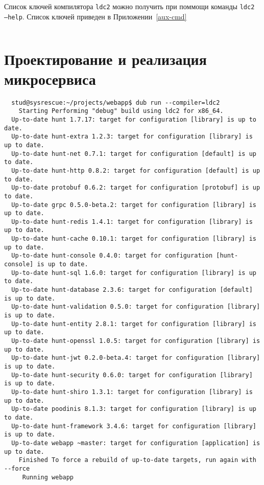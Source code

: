 \documentclass{studrep}
\begin{document}
Список ключей компилятора \texttt{ldc2} можно получить при поммощи команды \texttt{ldc2 --help}. Список ключей приведен в Приложении~\ref{aux-cmd}

\begin{verbatim}

\end{verbatim}

\chapter{Проектирование и реализация микросервиса}



\begin{verbatim}
  stud@sysrescue:~/projects/webapp$ dub run --compiler=ldc2
    Starting Performing "debug" build using ldc2 for x86_64.
  Up-to-date hunt 1.7.17: target for configuration [library] is up to date.
  Up-to-date hunt-extra 1.2.3: target for configuration [library] is up to date.
  Up-to-date hunt-net 0.7.1: target for configuration [default] is up to date.
  Up-to-date hunt-http 0.8.2: target for configuration [default] is up to date.
  Up-to-date protobuf 0.6.2: target for configuration [protobuf] is up to date.
  Up-to-date grpc 0.5.0-beta.2: target for configuration [library] is up to date.
  Up-to-date hunt-redis 1.4.1: target for configuration [library] is up to date.
  Up-to-date hunt-cache 0.10.1: target for configuration [library] is up to date.
  Up-to-date hunt-console 0.4.0: target for configuration [hunt-console] is up to date.
  Up-to-date hunt-sql 1.6.0: target for configuration [library] is up to date.
  Up-to-date hunt-database 2.3.6: target for configuration [default] is up to date.
  Up-to-date hunt-validation 0.5.0: target for configuration [library] is up to date.
  Up-to-date hunt-entity 2.8.1: target for configuration [library] is up to date.
  Up-to-date hunt-openssl 1.0.5: target for configuration [library] is up to date.
  Up-to-date hunt-jwt 0.2.0-beta.4: target for configuration [library] is up to date.
  Up-to-date hunt-security 0.6.0: target for configuration [library] is up to date.
  Up-to-date hunt-shiro 1.3.1: target for configuration [library] is up to date.
  Up-to-date poodinis 8.1.3: target for configuration [library] is up to date.
  Up-to-date hunt-framework 3.4.6: target for configuration [library] is up to date.
  Up-to-date webapp ~master: target for configuration [application] is up to date.
    Finished To force a rebuild of up-to-date targets, run again with --force
     Running webapp



\end{verbatim}
\end{document}

